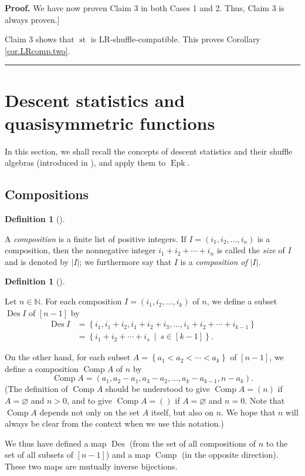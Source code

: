 \documentclass[numbers=enddot,12pt,final,onecolumn,notitlepage]{scrartcl}%
\theoremstyle{definition}
\newtheorem{defi}[theo]{Definition}
\newenvironment{definition}[1][]
{\begin{defi}[#1]\begin{leftbar}}
{\end{leftbar}\end{defi}}
\newenvironment{proof}[1][Proof]{\noindent\textbf{#1.} }{\ \rule{0.5em}{0.5em}}
\newenvironment{verlong}{}{}
\begin{document}
\begin{verlong}
\begin{proof}
We have now proven Claim 3 in both Cases 1 and 2. Thus, Claim 3 is always proven.]

Claim 3 shows that $\operatorname{st}$ is LR-shuffle-compatible. This proves
Corollary \ref{cor.LRcomp.two}.
\end{proof}
\end{verlong}

\section{\label{sect.Descent}Descent statistics and quasisymmetric functions}

In this section, we shall recall the concepts of descent statistics and their
shuffle algebras (introduced in \cite{part1}), and apply them to
$\operatorname{Epk}$.

\subsection{Compositions}

\begin{definition}
A \textit{composition} is a finite list of positive integers. If $I=\left(
i_{1},i_{2},\ldots,i_{n}\right)  $ is a composition, then the nonnegative
integer $i_{1}+i_{2}+\cdots+i_{n}$ is called the \textit{size} of $I$ and is
denoted by $\left\vert I\right\vert $; we furthermore say that $I$ is a
\textit{composition of }$\left\vert I\right\vert $.
\end{definition}

\begin{definition}
\label{def.comps-to-sets}Let $n\in\mathbb{N}$. For each composition $I=\left(
i_{1},i_{2},\ldots,i_{k}\right)  $ of $n$, we define a subset
$\operatorname{Des}I$ of $\left[  n-1\right]  $ by%
\begin{align*}
\operatorname{Des}I  &  =\left\{  i_{1},i_{1}+i_{2},i_{1}+i_{2}+i_{3}%
,\ldots,i_{1}+i_{2}+\cdots+i_{k-1}\right\} \\
&  =\left\{  i_{1}+i_{2}+\cdots+i_{s}\ \mid\ s\in\left[  k-1\right]  \right\}
.
\end{align*}


On the other hand, for each subset $A=\left\{  a_{1}<a_{2}<\cdots
<a_{k}\right\}  $ of $\left[  n-1\right]  $, we define a composition
$\operatorname*{Comp}A$ of $n$ by%
\[
\operatorname*{Comp}A=\left(  a_{1},a_{2}-a_{1},a_{3}-a_{2},\ldots
,a_{k}-a_{k-1},n-a_{k}\right)  .
\]
(The definition of $\operatorname*{Comp}A$ should be understood to give
$\operatorname*{Comp}A=\left(  n\right)  $ if $A=\varnothing$ and $n > 0$,
and to give
$\operatorname*{Comp}A=\left( \right)  $ if $A=\varnothing$ and $n = 0$.
Note that
$\operatorname*{Comp}A$ depends not only on the set $A$ itself, but also on
$n$. We hope that $n$ will always be clear from the context when we use this notation.)

We thus have defined a map $\operatorname{Des}$ (from the set of all
compositions of $n$ to the set of all subsets of $\left[  n-1\right]  $) and a
map $\operatorname*{Comp}$ (in the opposite direction). These two maps are
mutually inverse bijections.
\end{definition}
\end{document}
